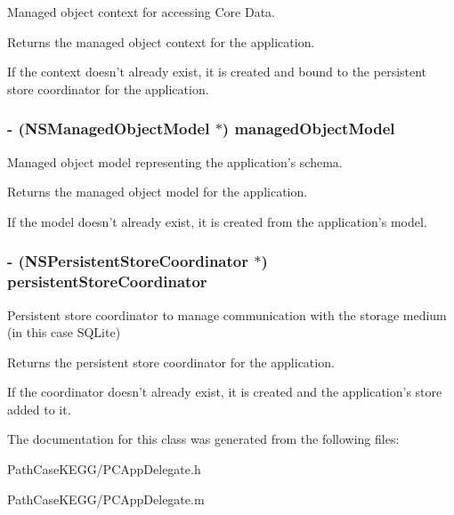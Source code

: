 Managed object context for accessing Core Data. 

Returns the managed object context for the application.

If the context doesn't already exist, it is created and bound to the persistent store coordinator for the application. \hypertarget{interface_p_c_app_delegate_acf3035b95e2a03cabab1d92ff2831b7c}{
\subsubsection[{managedObjectModel}]{\setlength{\rightskip}{0pt plus 5cm}-\/ (NSManagedObjectModel $\ast$) managedObjectModel}}
\label{interface_p_c_app_delegate_acf3035b95e2a03cabab1d92ff2831b7c}


Managed object model representing the application's schema. 

Returns the managed object model for the application.

If the model doesn't already exist, it is created from the application's model. \hypertarget{interface_p_c_app_delegate_aef8aefeba1dc9c793c031314d2cec738}{
\subsubsection[{persistentStoreCoordinator}]{\setlength{\rightskip}{0pt plus 5cm}-\/ (NSPersistentStoreCoordinator $\ast$) persistentStoreCoordinator}}
\label{interface_p_c_app_delegate_aef8aefeba1dc9c793c031314d2cec738}


Persistent store coordinator to manage communication with the storage medium (in this case SQLite) 

Returns the persistent store coordinator for the application.

If the coordinator doesn't already exist, it is created and the application's store added to it. 

The documentation for this class was generated from the following files:\begin{DoxyCompactItemize}
\item 
PathCaseKEGG/PCAppDelegate.h\item 
PathCaseKEGG/PCAppDelegate.m\end{DoxyCompactItemize}
